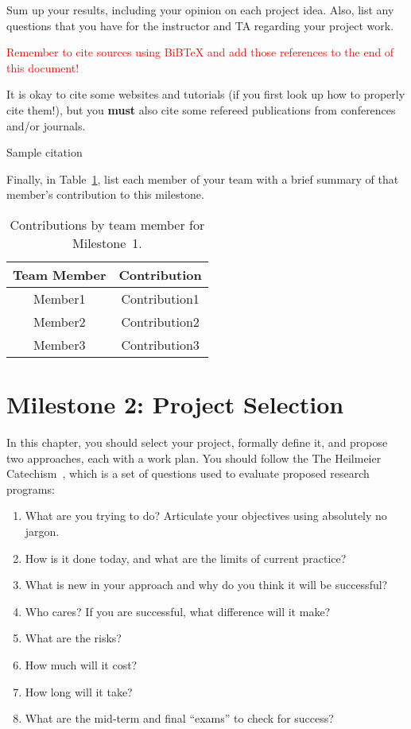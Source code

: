 \documentclass{report}
\begin{document}
Sum up your results, including your opinion on each project idea.  Also, list any questions that you have for the instructor and TA regarding your project work.

\textcolor{red}{Remember to cite sources using BiBTeX and add those references to the end of this document!}

It is okay to cite some websites and tutorials (if you first look up how to properly cite them!), but you {\bf must} also cite some refereed publications from conferences and/or journals.

Sample citation~\cite{Samuel59}

Finally, in Table~\ref{tab:contribution1}, list each member of your team with a brief summary of that member's contribution to this milestone.

\begin{table}[]
    \caption{Contributions by team member for Milestone~1.}
    \centering
    \begin{tabular}{|c|c|} \hline
    {\bf Team Member}     &  {\bf Contribution}  \\ \hline
    Member1     &  Contribution1 \\
    Member2     &  Contribution2 \\
    Member3     &  Contribution3 \\ \hline
    \end{tabular}
    \label{tab:contribution1}
\end{table}


\chapter{Milestone 2: Project Selection}

In this chapter, you should select your project, formally define it, and propose two approaches, each with a work plan.  You should follow the The Heilmeier Catechism~\cite{heilmeier}, which is a set of questions used to evaluate proposed research programs:  
\begin{enumerate}
    \item What are you trying to do? Articulate your objectives using absolutely no jargon.
   \item How is it done today, and what are the limits of current practice?
   \item What is new in your approach and why do you think it will be successful?
   \item Who cares? If you are successful, what difference will it make?
   \item What are the risks?
   \item How much will it cost?
   \item How long will it take?
   \item What are the mid-term and final ``exams'' to check for success?
\end{enumerate}
\end{document}
